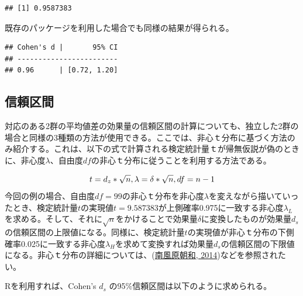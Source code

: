 \documentclass[
  ja=standard, xelatex, base=12pt]{bxjsreport}
\newenvironment{Shaded}{\begin{snugshade}}{\end{snugshade}}
\newcommand{\AttributeTok}[1]{\textcolor[rgb]{0.77,0.63,0.00}{#1}}
\newcommand{\CommentTok}[1]{\textcolor[rgb]{0.56,0.35,0.01}{\textit{#1}}}
\newcommand{\FunctionTok}[1]{\textcolor[rgb]{0.00,0.00,0.00}{#1}}
\newcommand{\NormalTok}[1]{#1}
\newcommand{\SpecialCharTok}[1]{\textcolor[rgb]{0.00,0.00,0.00}{#1}}
\begin{document}
\begin{verbatim}
## [1] 0.9587383
\end{verbatim}

既存のパッケージを利用した場合でも同様の結果が得られる。

\begin{Shaded}
\end{Shaded}

\begin{verbatim}
## Cohen's d |       95% CI
## ------------------------
## 0.96      | [0.72, 1.20]
\end{verbatim}

\hypertarget{ux4fe1ux983cux533aux9593-1}{%
\subsection{信頼区間}\label{ux4fe1ux983cux533aux9593-1}}

対応のある2群の平均値差の効果量の信頼区間の計算についても、独立した2群の場合と同様の3種類の方法が使用できる。ここでは、非心ｔ分布に基づく方法のみ紹介する。これは、以下の式で計算される検定統計量ｔが帰無仮説が偽のときに、非心度\(λ\)、自由度\(df\)の非心ｔ分布に従うことを利用する方法である。

\[
t=d_z*\sqrt{n},\\
\lambda=\delta*\sqrt{n},\\
df=n-1
\]
今回の例の場合、自由度\(df=99\)の非心ｔ分布を非心度\(λ\)を変えながら描いていったとき、検定統計量\(t\)の実現値\(t=9.587383\)が上側確率0.975に一致する非心度\(λ_L\)を求める。そして、それに\(\sqrt{n}\)をかけることで効果量\(\delta\)に変換したものが効果量\(d_s\)の信頼区間の上限値になる。同様に、検定統計量\(t\)の実現値が非心ｔ分布の下側確率0.025に一致する非心度\(λ_H\)を求めて変換すれば効果量\(d_s\)の信頼区間の下限値になる。非心ｔ分布の詳細については、(\protect\hyperlink{ref-haebara2014}{南風原朝和, 2014})などを参照されたい。

Rを利用すれば、Cohen's \(d_s\) の95\%信頼区間は以下のように求められる。
\end{document}
